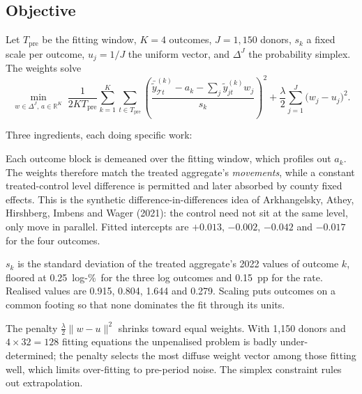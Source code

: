 \documentclass[11pt,a4paper]{article}
\newcommand{\Tr}{\mathcal{T}}
\newcommand{\lp}{log-\%}
\begin{document}
\subsection{Objective}
Let $T_{\text{pre}}$ be the fitting window, $K=4$ outcomes, $J=1{,}150$ donors, $s_k$ a fixed scale per
outcome, $u_j=1/J$ the uniform vector, and $\Delta^J$ the probability simplex. The weights solve
\begin{equation}\label{eq:obj}
\min_{w\in\Delta^{J},\,a\in\mathbb{R}^K}\;
\frac{1}{2KT_{\text{pre}}}\sum_{k=1}^{K}\sum_{t\in T_{\text{pre}}}
\left(\frac{\bar{\tilde y}^{(k)}_{\Tr t}-a_k-\sum_j\tilde y^{(k)}_{jt}w_j}{s_k}\right)^{2}
+\frac{\lambda}{2}\sum_{j=1}^{J}\big(w_j-u_j\big)^2 .
\end{equation}

Three ingredients, each doing specific work:

\begin{description}[leftmargin=1.2em,style=nextline]
\item[The intercepts $a_k$.] Each outcome block is demeaned over the fitting window, which profiles out
$a_k$. The weights therefore match the treated aggregate's \emph{movements}, while a constant
treated-control level difference is permitted and later absorbed by county fixed effects. This is the
synthetic difference-in-differences idea of Arkhangelsky, Athey, Hirshberg, Imbens and Wager (2021):
the control need not sit at the same level, only move in parallel. Fitted intercepts are
$+0.013$, $-0.002$, $-0.042$ and $-0.017$ for the four outcomes.
\item[The scales $s_k$.] $s_k$ is the standard deviation of the treated aggregate's 2022 values of
outcome $k$, floored at 0.25~\lp\ for the three log outcomes and 0.15~pp for the rate. Realised values
are 0.915, 0.804, 1.644 and 0.279. Scaling puts outcomes on a common footing so that none dominates
the fit through its units.
\item[The ridge toward uniform.] The penalty $\tfrac{\lambda}{2}\|w-u\|^2$ shrinks toward equal weights.
With 1{,}150 donors and $4\times32=128$ fitting equations the unpenalised problem is badly
under-determined; the penalty selects the most diffuse weight vector among those fitting well, which
limits over-fitting to pre-period noise. The simplex constraint rules out extrapolation.
\end{description}
\end{document}
